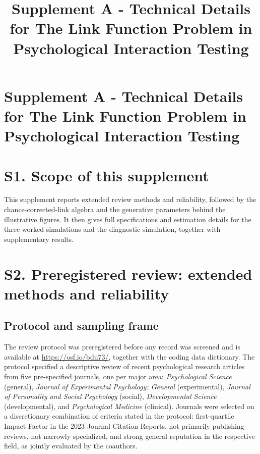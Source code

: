\documentclass[
  man,
  floatsintext,
  longtable,
  nolmodern,
  notxfonts,
  notimes,
  colorlinks=true,linkcolor=blue,citecolor=blue,urlcolor=blue]{apa7}
\title{Supplement A - Technical Details for The Link Function Problem in
Psychological Interaction Testing}
\begin{document}
\maketitle


\hypertarget{toc}{}
\tableofcontents
\newpage
\section[Introduction]{Supplement A - Technical Details for The Link
Function Problem in Psychological Interaction Testing}


\setlength\LTleft{0pt}




\section{S1. Scope of this
supplement}\label{s1.-scope-of-this-supplement}

This supplement reports extended review methods and reliability,
followed by the chance-corrected-link algebra and the generative
parameters behind the illustrative figures. It then gives full
specifications and estimation details for the three worked simulations
and the diagnostic simulation, together with supplementary results.

\section{S2. Preregistered review: extended methods and
reliability}\label{s2.-preregistered-review-extended-methods-and-reliability}

\subsection{Protocol and sampling
frame}\label{protocol-and-sampling-frame}

The review protocol was preregistered before any record was screened and
is available at \url{https://osf.io/bdu73/}, together with the coding
data dictionary. The protocol specified a descriptive review of recent
psychological research articles from five pre-specified journals, one
per major area: \emph{Psychological Science} (general), \emph{Journal of
Experimental Psychology: General} (experimental), \emph{Journal of
Personality and Social Psychology} (social), \emph{Developmental
Science} (developmental), and \emph{Psychological Medicine} (clinical).
Journals were selected on a discretionary combination of criteria stated
in the protocol: first-quartile Impact Factor in the 2023 Journal
Citation Reports, not primarily publishing reviews, not narrowly
specialized, and strong general reputation in the respective field, as
jointly evaluated by the coauthors.
\end{document}
